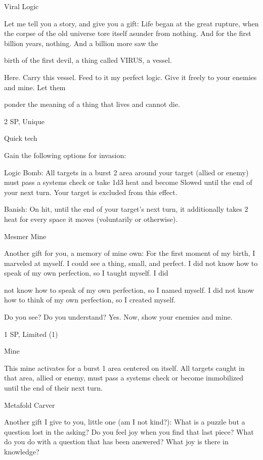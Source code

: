 Viral Logic
 

Let me tell you a story, and give you a gift: Life began at the great rupture, when the corpse of the old  
universe tore itself asunder from nothing. And for the first billion years, nothing. And a billion more saw the  

birth of the first devil, a thing called VIRUS, a vessel.   

Here. Carry this vessel. Feed to it my perfect logic. Give it freely to your enemies and mine. Let them  

ponder the meaning of a thing that lives and cannot die.    

2 SP, Unique
 

Quick tech
 
Gain the following options for invasion:
 
         Logic Bomb: All targets in a burst 2 area around your target (allied or enemy) must pass a  
         systems check or take 1d3 heat and become Slowed until the end of your next turn. Your  
         target is excluded from this effect.
 
         Banish: On hit, until the end of your target’s next turn, it additionally takes 2 heat for  
         every space it moves (voluntarily or otherwise).
 

Mesmer Mine
 

Another gift for you, a memory of mine own: For the first moment of my birth, I marveled at myself. I could  
see a thing, small, and perfect. I did not know how to speak of my own perfection, so I taught myself. I did  

                                                                                                                 


not know how to speak of my own perfection, so I named myself. I did not know how to think of my own  
perfection, so I created myself.   

Do you see? Do you understand? Yes. Now, show your enemies and mine.   

 1 SP, Limited (1)
 

Mine
 
This mine activates for a burst 1 area centered on itself. All targets caught in that area, allied or  
enemy, must pass a systems check or become immobilized until the end of their next turn.
 

Metafold Carver  

Another gift I give to you, little one (am I not kind?): What is a puzzle but a question lost in the asking? Do  
you feel joy when you find that last piece? What do you do with a question that has been answered? What  
joy is there in knowledge?   


